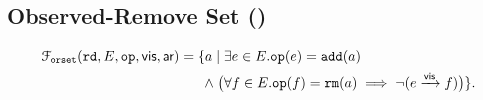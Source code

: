 
\subsection{Observed-Remove Set (\ORset{})}	\label{ss:orset}

\begin{align}
  \mathcal{F}_{\texttt{orset}}(\texttt{rd}, E, \texttt{op}, \textsf{vis}, \textsf{ar})
  = \{a \mid\; &\exists e \in E. \texttt{op}(e) = \texttt{add}(a) \\
  \land\; \big(&\forall f \in E. \texttt{op}(f) = \texttt{rm}(a) \implies \lnot(e \xrightarrow{\textsf{vis}} f)\big)\}.
\end{align}


